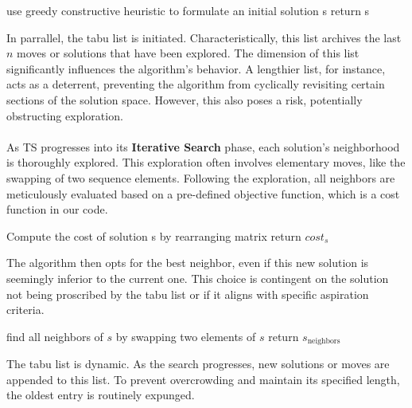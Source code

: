 \documentclass[a4paper,10pt]{article}
\begin{document}
\begin{algorithm}[H]
\begin{algorithmic}
        \State use greedy constructive heuristic to formulate an initial solution s
        \State return s
    \EndProcedure
\end{algorithmic}
\end{algorithm}

In parrallel, the tabu list is initiated. Characteristically, this list archives the last \(n\) moves or solutions that have been explored\cite{GLOVER1999}. The dimension of this list significantly influences the algorithm's behavior. A lengthier list, for instance, acts as a deterrent, preventing the algorithm from cyclically revisiting certain sections of the solution space. However, this also poses a risk, potentially obstructing exploration.\\
\\
As TS progresses into its \textbf{Iterative Search} phase, each solution's neighborhood is thoroughly explored. This exploration often involves elementary moves, like the swapping of two sequence elements\cite{GLOVER1999}. Following the exploration, all neighbors are meticulously evaluated based on a pre-defined objective function, which is a cost function in our code.

\begin{algorithm}[H]
\begin{algorithmic}
        \State Compute the cost of solution s by rearranging matrix
        \State return \(cost_s\)
    \EndProcedure
\end{algorithmic}
\end{algorithm}

The algorithm then opts for the best neighbor, even if this new solution is seemingly inferior to the current one. This choice is contingent on the solution not being proscribed by the tabu list or if it aligns with specific aspiration criteria\cite{GLOVER1999}. 

\begin{algorithm}[H]
\begin{algorithmic}
        \State find all neighbors of \(s\) by swapping two elements of \(s\)
        \State return \(s_{\text{neighbors}}\)
    \EndProcedure
\end{algorithmic}
\end{algorithm}


The tabu list is dynamic. As the search progresses, new solutions or moves are appended to this list. To prevent overcrowding and maintain its specified length, the oldest entry is routinely expunged\cite{GLOVER1999}. 
\end{document}
